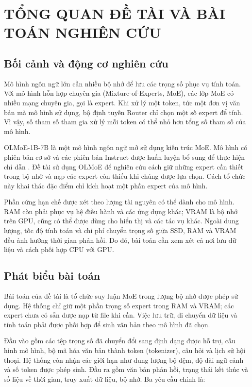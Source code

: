 \chapter{TỔNG QUAN ĐỀ TÀI VÀ BÀI TOÁN NGHIÊN CỨU}


\section{Bối cảnh và động cơ nghiên cứu}

Mô hình ngôn ngữ lớn cần nhiều bộ nhớ để lưu các trọng số phục vụ tính toán. Với mô hình hỗn hợp chuyên gia (Mixture-of-Experts, MoE), các lớp MoE có nhiều mạng chuyên gia, gọi là expert. Khi xử lý một token, tức một đơn vị văn bản mà mô hình sử dụng, bộ định tuyến Router chỉ chọn một số expert để tính. Vì vậy, số tham số tham gia xử lý mỗi token có thể nhỏ hơn tổng số tham số của mô hình.

OLMoE-1B-7B là một mô hình ngôn ngữ mở sử dụng kiến trúc MoE. Mô hình có phiên bản cơ sở và các phiên bản Instruct được huấn luyện bổ sung để thực hiện chỉ dẫn \cite{olmoe}. Đề tài sử dụng OLMoE để nghiên cứu cách giữ những expert cần thiết trong bộ nhớ và nạp các expert còn thiếu khi chúng được lựa chọn. Cách tổ chức này khai thác đặc điểm chỉ kích hoạt một phần expert của mô hình.

Phần cứng hạn chế được xét theo lượng tài nguyên có thể dành cho mô hình. RAM còn phải phục vụ hệ điều hành và các ứng dụng khác; VRAM là bộ nhớ trên GPU, cũng có thể được dùng cho hiển thị và các tác vụ khác. Ngoài dung lượng, tốc độ tính toán và chi phí chuyển trọng số giữa SSD, RAM và VRAM đều ảnh hưởng thời gian phản hồi. Do đó, bài toán cần xem xét cả nơi lưu dữ liệu và cách phối hợp CPU với GPU.

\section{Phát biểu bài toán}

Bài toán của đề tài là tổ chức suy luận MoE trong lượng bộ nhớ được phép sử dụng. Hệ thống chỉ giữ một phần trọng số expert trong RAM và VRAM; các expert chưa có sẵn được nạp từ file khi cần. Việc lưu trữ, di chuyển dữ liệu và tính toán phải được phối hợp để sinh văn bản theo mô hình đã chọn.

Đầu vào gồm các tệp trọng số đã chuyển đổi sang định dạng được hỗ trợ, cấu hình mô hình, bộ mã hóa văn bản thành token (tokenizer), câu hỏi và lịch sử hội thoại. Hệ thống còn nhận các giới hạn như dung lượng bộ đệm, độ dài ngữ cảnh và số token được phép sinh. Đầu ra gồm văn bản phản hồi, trạng thái kết thúc và số liệu về thời gian, truy xuất dữ liệu, bộ nhớ. Ba yêu cầu chính là:

